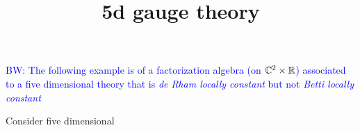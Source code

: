 \documentclass[10pt]{amsart}
\title{5d gauge theory}
\def\brian{\textcolor{blue}{BW: }\textcolor{blue}}
\begin{document}
\maketitle


\brian{The following example is of a factorization algebra (on $\mathbb C^2 \times \mathbb R$) associated to a five dimensional theory that is {\em de Rham locally constant} but not {\em Betti locally constant}}

Consider five dimensional 
\end{document}
